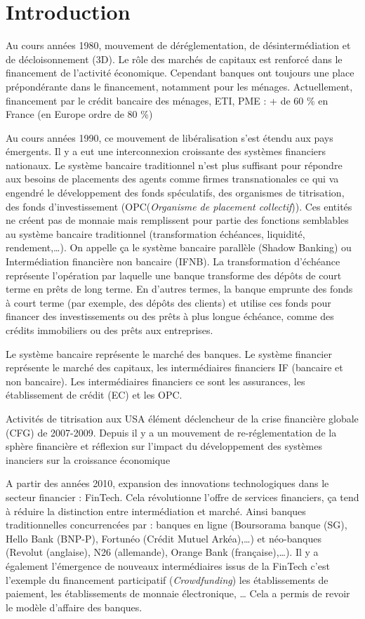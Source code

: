 \documentclass[a4paper, 12pt]{report}
\begin{document}
	
	\chapter*{Introduction}
	
Au cours années 1980, mouvement de déréglementation, de désintermédiation et de décloisonnement (3D). Le rôle des marchés de capitaux est renforcé dans le financement de l’activité économique. Cependant banques ont toujours une place prépondérante dans le financement, notamment pour les ménages. 
Actuellement, financement par le crédit bancaire des ménages, ETI, PME : +
de 60 \% en France (en Europe ordre de 80 \%)

Au cours années 1990, ce mouvement de libéralisation s’est étendu aux pays émergents. Il y a eut une interconnexion croissante des systèmes financiers nationaux. Le système bancaire traditionnel n’est plus suffisant pour répondre
aux besoins de placements des agents comme firmes transnationales ce qui va engendré le développement des fonds spéculatifs, des organismes de
titrisation, des fonds d’investissement (OPC(\textit{Organisme de placement collectif})). Ces entités ne créent pas de monnaie mais remplissent pour partie des fonctions semblables au système bancaire traditionnel (transformation échéances, liquidité, rendement,…). On appelle ça le système bancaire parallèle (Shadow Banking) ou Intermédiation financière non bancaire (IFNB). La transformation d'échéance représente l'opération par laquelle une banque transforme des dépôts de court terme en prêts de long terme. En d'autres termes, la banque emprunte des fonds à court terme (par exemple, des dépôts des clients) et utilise ces fonds pour financer des investissements ou des prêts à plus longue échéance, comme des crédits immobiliers ou des prêts aux entreprises.

Le système bancaire représente le marché des banques. Le système financier représente le marché des capitaux, les intermédiaires financiers IF (bancaire et non bancaire). Les intermédiaires financiers ce sont les assurances, les établissement de crédit (EC) et les OPC.

Activités de titrisation aux USA élément déclencheur de la crise financière globale (CFG) de 2007-2009. Depuis il y a un mouvement de re-réglementation de la sphère financière et réflexion sur l’impact du développement des systèmes inanciers sur la croissance économique

A partir des années 2010, expansion des innovations technologiques dans le secteur financier : FinTech. Cela révolutionne l’offre de services financiers, ça tend à réduire la distinction entre intermédiation et marché. Ainsi banques traditionnelles concurrencées par : banques en ligne (Boursorama banque (SG), Hello Bank (BNP-P), Fortunéo (Crédit Mutuel Arkéa),…) et néo-banques (Revolut (anglaise), N26 (allemande), Orange Bank (française),…). Il y a également l'émergence de nouveaux intermédiaires issus de la FinTech c'est l'exemple du financement participatif (\textit{Crowdfunding}) les établissements de paiement, les établissements de monnaie électronique, … Cela a permis de revoir le modèle d’affaire des banques.
\end{document}
